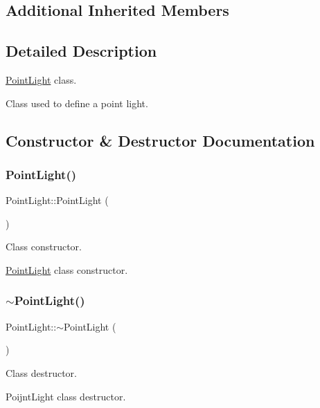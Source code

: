\subsection*{Additional Inherited Members}


\subsection{Detailed Description}
\hyperlink{class_point_light}{Point\+Light} class. 

Class used to define a point light. 

\subsection{Constructor \& Destructor Documentation}
\mbox{\label{class_point_light_abbfdf5f05b559c49016f8bb97b0ca414}} 
\subsubsection{\texorpdfstring{Point\+Light()}{PointLight()}}
{\footnotesize\ttfamily Point\+Light\+::\+Point\+Light (\begin{DoxyParamCaption}{ }\end{DoxyParamCaption})}



Class constructor. 

\hyperlink{class_point_light}{Point\+Light} class constructor. \mbox{\label{class_point_light_aa12d9005d5372dbbe655a82231634341}} 
\subsubsection{\texorpdfstring{$\sim$\+Point\+Light()}{~PointLight()}}
{\footnotesize\ttfamily Point\+Light\+::$\sim$\+Point\+Light (\begin{DoxyParamCaption}{ }\end{DoxyParamCaption})}



Class destructor. 

Poijnt\+Light class destructor. 

